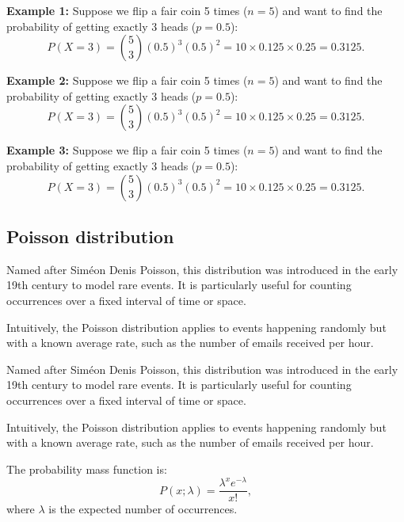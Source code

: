 \documentclass{book}
\begin{document}
\textbf{Example 1:} Suppose we flip a fair coin 5 times ($n=5$) and want to find the probability of getting exactly 3 heads ($p=0.5$):
\begin{equation}
    P(X=3) = \binom{5}{3} (0.5)^3 (0.5)^2 = 10 \times 0.125 \times 0.25 = 0.3125.
\end{equation}

\textbf{Example 2:} Suppose we flip a fair coin 5 times ($n=5$) and want to find the probability of getting exactly 3 heads ($p=0.5$):
\begin{equation}
    P(X=3) = \binom{5}{3} (0.5)^3 (0.5)^2 = 10 \times 0.125 \times 0.25 = 0.3125.
\end{equation}

\textbf{Example 3:} Suppose we flip a fair coin 5 times ($n=5$) and want to find the probability of getting exactly 3 heads ($p=0.5$):
\begin{equation}
    P(X=3) = \binom{5}{3} (0.5)^3 (0.5)^2 = 10 \times 0.125 \times 0.25 = 0.3125.
\end{equation}

\newpage
\subsection{Poisson distribution}
Named after Sim\'eon Denis Poisson, this distribution was introduced in the early 19th century to model rare events. It is particularly useful for counting occurrences over a fixed interval of time or space.

Intuitively, the Poisson distribution applies to events happening randomly but with a known average rate, such as the number of emails received per hour.

Named after Sim\'eon Denis Poisson, this distribution was introduced in the early 19th century to model rare events. It is particularly useful for counting occurrences over a fixed interval of time or space.

Intuitively, the Poisson distribution applies to events happening randomly but with a known average rate, such as the number of emails received per hour.

The probability mass function is:
\begin{equation}
    P(x; \lambda) = \frac{\lambda^x e^{-\lambda}}{x!},
\end{equation}
where $\lambda$ is the expected number of occurrences.
\end{document}

